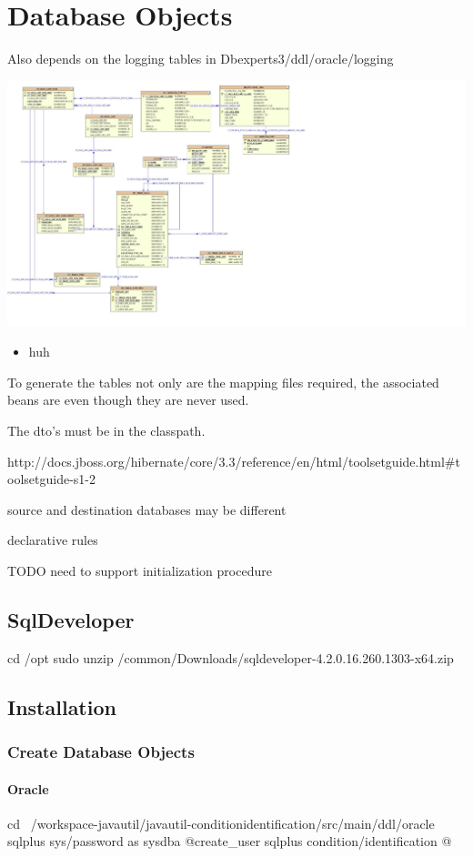 \chapter {Database Objects}
Also depends on the logging tables in Dbexperts3/ddl/oracle/logging

\includegraphics*[width=\textwidth,viewport=0 0 3046 1632, bb=0 0 3046 1632]{ExceptionProcessing.jpeg}

\begin{itemize}
	\item huh
\end{itemize}

To generate the tables not only are the mapping files required, the associated beans are even though they are 
never used. 

The dto's must be in the classpath.

http://docs.jboss.org/hibernate/core/3.3/reference/en/html/toolsetguide.html#toolsetguide-s1-2




source and destination databases may be different 

declarative rules

TODO need to support initialization procedure
\section{SqlDeveloper}
cd /opt
sudo unzip /common/Downloads/sqldeveloper-4.2.0.16.260.1303-x64.zip 

\section{Installation}
\subsection{Create Database Objects}
\subsubsection{Oracle}

cd ~/workspace-javautil/javautil-conditionidentification/src/main/ddl/oracle
sqlplus sys/password as sysdba @create_user
sqlplus condition/identification @ 



